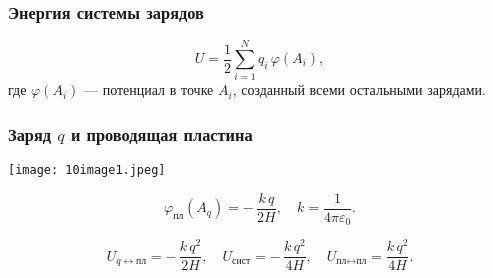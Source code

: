 \documentclass[12pt, a4paper]{article}
\begin{document}
\subsubsection*{Энергия системы зарядов}
\[
U=\frac12\sum_{i=1}^N q_i\,\varphi(A_i),
\]
где \(\varphi(A_i)\) — потенциал в точке \(A_i\), созданный всеми остальными зарядами.

\subsubsection*{Заряд \(q\) и проводящая пластина}

\begin{center}
\texttt{[image: 10image1.jpeg]}
\end{center}

\[
\varphi_{\text{пл}}(A_q)=-\,\frac{k\,q}{2H},\quad k=\frac{1}{4\pi\varepsilon_0}.
\]

\[
\boxed{
U_{q\leftrightarrow \text{пл}}=-\,\frac{k\,q^2}{2H},\quad
U_{\text{сист}}=-\,\frac{k\,q^2}{4H},\quad
U_{\text{пл}\leftrightarrow \text{пл}}=\frac{k\,q^2}{4H}.
}
\]
\end{document}
